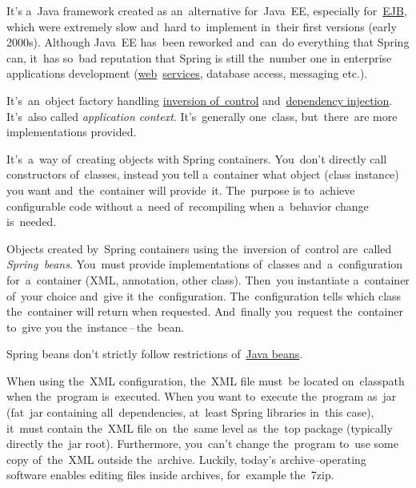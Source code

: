 \label{springframework}
It's a~Java framework created as an~alternative for~Java~EE, especially for~\hyperref[enterprisejavabeans]{EJB}, which were extremely slow and~hard to~implement in~their first versions (early 2000s). Although Java~EE has~been reworked and~can~do everything that Spring can, it~has so~bad reputation that Spring is still the~number one in enterprise applications development (\hyperref[internetweb]{web}~\hyperref[applicationprocessprogramservicethread]{services}, database access, messaging etc.).

\label{springcontainrer}
It's~an~object factory handling \hyperref[inversionofcontrol]{inversion of~control} and~\hyperref[dependencyinjection]{dependency injection}. It's~also called \textit{application context}. It's~generally one~class, but~there~are more implementations provided.

\label{inversionofcontrol}
It's~a~way of~creating objects with Spring containers. You~don't directly call constructors of~classes, instead you tell a~container what object (class instance) you want and~the~container will provide~it. The~purpose is to~achieve configurable code without a~need of~recompiling when a~behavior change is~needed.

Objects created by~Spring containers using the~inversion of~control are~called \textit{Spring~beans}. You~must provide implementations of~classes and~a~configuration for~a~container (XML, annotation, other class). Then~you instantiate a~container of~your choice and~give it the~configuration. The~configuration tells which class the~container will return when requested. And~finally you~request the~container to~give you the~instance\,--\,the~bean.

\warning Spring beans don't strictly follow restrictions of~\hyperref[javabeans]{Java beans}.

\warning When using the~XML configuration, the~XML file must~be located on~classpath when the~program is~executed. When you want to~execute the~program as~jar (fat~jar containing all~dependencies, at~least Spring libraries in~this case), it~must contain the~XML file on~the~same level as~the~top package (typically directly the~jar root). Furthermore, you~can't change the~program to~use some copy of~the~XML outside the~archive. Luckily, today's archive--operating software enables editing files inside archives, for~example the~7zip.

